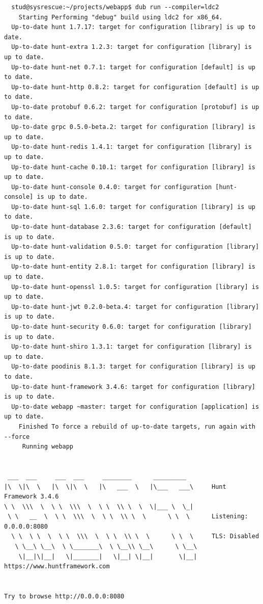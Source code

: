 \documentclass{studrep}
\begin{document}
\begin{verbatim}
  stud@sysrescue:~/projects/webapp$ dub run --compiler=ldc2
    Starting Performing "debug" build using ldc2 for x86_64.
  Up-to-date hunt 1.7.17: target for configuration [library] is up to date.
  Up-to-date hunt-extra 1.2.3: target for configuration [library] is up to date.
  Up-to-date hunt-net 0.7.1: target for configuration [default] is up to date.
  Up-to-date hunt-http 0.8.2: target for configuration [default] is up to date.
  Up-to-date protobuf 0.6.2: target for configuration [protobuf] is up to date.
  Up-to-date grpc 0.5.0-beta.2: target for configuration [library] is up to date.
  Up-to-date hunt-redis 1.4.1: target for configuration [library] is up to date.
  Up-to-date hunt-cache 0.10.1: target for configuration [library] is up to date.
  Up-to-date hunt-console 0.4.0: target for configuration [hunt-console] is up to date.
  Up-to-date hunt-sql 1.6.0: target for configuration [library] is up to date.
  Up-to-date hunt-database 2.3.6: target for configuration [default] is up to date.
  Up-to-date hunt-validation 0.5.0: target for configuration [library] is up to date.
  Up-to-date hunt-entity 2.8.1: target for configuration [library] is up to date.
  Up-to-date hunt-openssl 1.0.5: target for configuration [library] is up to date.
  Up-to-date hunt-jwt 0.2.0-beta.4: target for configuration [library] is up to date.
  Up-to-date hunt-security 0.6.0: target for configuration [library] is up to date.
  Up-to-date hunt-shiro 1.3.1: target for configuration [library] is up to date.
  Up-to-date poodinis 8.1.3: target for configuration [library] is up to date.
  Up-to-date hunt-framework 3.4.6: target for configuration [library] is up to date.
  Up-to-date webapp ~master: target for configuration [application] is up to date.
    Finished To force a rebuild of up-to-date targets, run again with --force
     Running webapp


 ___  ___     ___  ___     ________      _________
|\  \|\  \   |\  \|\  \   |\   ___  \   |\___   ___\     Hunt Framework 3.4.6
\ \  \\\  \  \ \  \\\  \  \ \  \\ \  \  \|___ \  \_|
 \ \   __  \  \ \  \\\  \  \ \  \\ \  \      \ \  \      Listening: 0.0.0.0:8080
  \ \  \ \  \  \ \  \\\  \  \ \  \\ \  \      \ \  \     TLS: Disabled
   \ \__\ \__\  \ \_______\  \ \__\\ \__\      \ \__\
    \|__|\|__|   \|_______|   \|__| \|__|       \|__|    https://www.huntframework.com


Try to browse http://0.0.0.0:8080
\end{verbatim}
\end{document}
